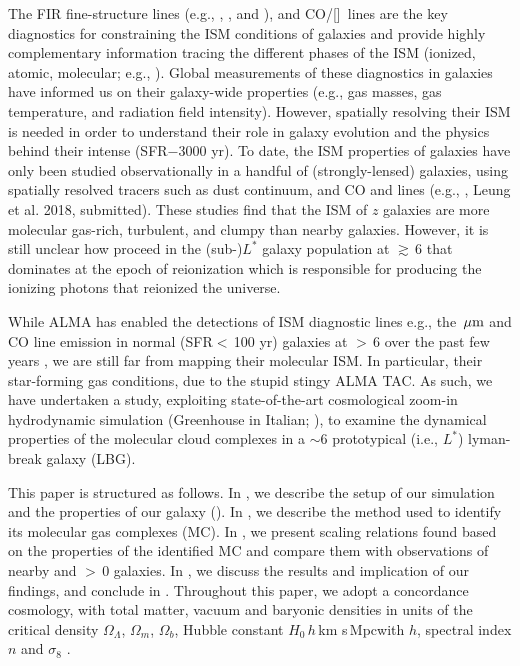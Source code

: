 \documentclass[apj]{emulateapj} %
\begin{document}
The FIR fine-structure lines (e.g., \cii, \nii, and \oiii), and CO/[\ci]~lines are the key diagnostics for 
constraining the ISM conditions of galaxies and
provide highly complementary information tracing the different phases of the ISM (ionized, 
atomic, molecular; e.g., \citealt{Scoville74a, Rubin85a, Malhotra01a}).
Global measurements of these diagnostics in \highz galaxies 
have informed us on their galaxy-wide properties (e.g., 
gas masses, gas temperature, and radiation field intensity).
However, spatially resolving their ISM is needed in order to understand their role in galaxy evolution and 
the physics behind their intense \SF (SFR$-$3000\,\Msun \,yr\pmOne).
To date, the ISM properties of \highz galaxies 
have only been studied observationally in a handful of (strongly-lensed) 
galaxies, using spatially resolved tracers such as 
dust continuum, and CO and \cii lines (e.g., \citealt{Swinbank11a, Hodge15a, Ferkinhoff15a, Hodge16a},
Leung et al. 2018, submitted).
These studies find that the ISM of $z$ galaxies are more 
molecular gas-rich, turbulent, and clumpy than nearby galaxies.
However, it is still unclear how \SF proceed in the (sub-)$L^*$ galaxy population at \z$\gtrsim$\,6 
that dominates  \SF at the epoch of reionization which is responsible for producing the 
ionizing photons that reionized the universe.

While ALMA has enabled the detections of 
ISM diagnostic lines e.g., the \,$\mbox{$\mu$m}$ and CO line emission in 
normal (SFR$<$\,100\,\Msun\,yr\pmOne) galaxies at \z$>$\,6 over the past few years \citep[e.g.,][]{Smit18a},
we are still far from mapping their molecular ISM.
In particular, their star-forming gas conditions, due to the stupid stingy ALMA TAC.
As such, we have undertaken a study, exploiting 
state-of-the-art cosmological zoom-in hydrodynamic simulation 
 (Greenhouse in Italian; \citealt{Pallottini17a, Pallottini17b}), to examine 
the dynamical properties of the molecular cloud complexes in a \z$\sim$6 prototypical (i.e., $L^*$) lyman-break
galaxy (LBG).

This paper is structured as follows.
In , we describe the setup of our simulation and the properties of our galaxy (\flower).
In , we describe the method used to identify its molecular gas complexes (MC). 
In , we present scaling relations found based on the properties of 
the identified MC and compare them with observations of nearby and \z$>$\,0 galaxies.
In , we discuss the results and implication of our findings,
and conclude in .
Throughout this paper, we adopt a concordance cosmology, with total matter, vacuum and baryonic densities 
in units of the critical density $\Omega_{\Lambda}$, $\Omega_m$, $\Omega_b$, 
Hubble constant $H_0$\,$h$\,km s\pmOne\,Mpc\pmOne with $h$, 
spectral index $n$ and $\sigma_8$ \citep{Planck14a}.
\end{document}
